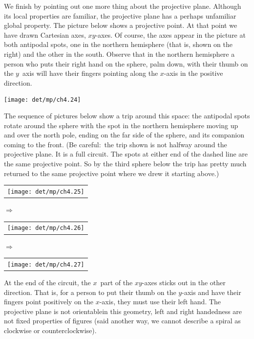 We finish by pointing out one more thing about the projective plane. 
Although its local properties are familiar, the projective plane has
a perhaps unfamiliar global property.
The picture below shows a projective point.
At that point we have drawn Cartesian axes, $xy$-axes.
Of course, the axes appear in the picture at both antipodal spots, one in the
northern hemisphere (that is, shown on the right) 
and the other in the
south.
Observe that
in the northern hemisphere a person who puts 
their right hand on the sphere, palm down, with their thumb on the
$y$~axis will have their fingers pointing 
along the $x$-axis in the 
positive direction.
\begin{center}
  \texttt{[image: det/mp/ch4.24]}
\end{center}
The sequence of pictures below 
show a trip around this space: 
the antipodal spots rotate around the sphere with the spot in the 
northern hemisphere moving up and over the north pole, ending on the
far side of the sphere, and its companion coming to the front.
(Be careful:~the trip shown is not halfway around the projective plane.
It is a full circuit.
The spots at either end of the dashed line are the same 
projective point.
So by the third sphere below the trip has pretty much returned 
to the same projective point where we drew it starting above.) 
\begin{center}
  \begin{tabular}{@{}c@{}}\texttt{[image: det/mp/ch4.25]}\end{tabular}
\qquad\mbox{$\Longrightarrow$}\qquad
  \begin{tabular}{@{}c@{}}\texttt{[image: det/mp/ch4.26]}\end{tabular}
\qquad\mbox{$\Longrightarrow$}\qquad
  \begin{tabular}{@{}c@{}}\texttt{[image: det/mp/ch4.27]}\end{tabular}
\end{center}
At the end of the circuit, 
the $x$~part of the $xy$-axes sticks out in the other direction.
That is, for a person to put their thumb on the $y$-axis and 
have their fingers point positively on the $x$-axis, they must
use their left hand.
The projective plane is not orientable\Dash in this geometry,
left and right handedness are not fixed properties of figures
(said another way, 
we cannot describe a spiral as clockwise or
counterclockwise).

